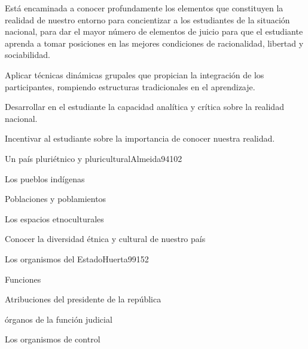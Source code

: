 \begin{syllabus}


\begin{justification}
Está encaminada a conocer profundamente los elementos que constituyen la realidad de 
nuestro entorno para concientizar a los estudiantes de la situación nacional, 
para dar el mayor número de elementos de juicio para que el estudiante aprenda a tomar 
posiciones en las mejores condiciones de racionalidad, libertad y sociabilidad.
\end{justification}

\begin{goals}
\item Aplicar técnicas dinámicas grupales que propician la integración de los participantes, rompiendo estructuras tradicionales en el aprendizaje.
\item Desarrollar en el estudiante la capacidad analítica y crítica sobre la realidad nacional.
\item Incentivar al estudiante sobre la importancia de conocer nuestra realidad.
\end{goals}

\begin{outcomes}
\end{outcomes}

\begin{unit}{Un país pluriétnico y pluricultural}{Almeida94}{10}{2}
   \begin{topics}
	\item Los pueblos indígenas
	\item Poblaciones y poblamientos
	\item Los espacios etnoculturales
   \end{topics}

   \begin{unitgoals}
      \item Conocer la diversidad étnica y cultural de nuestro país
   \end{unitgoals}
\end{unit}

\begin{unit}{Los organismos del Estado}{Huerta99}{15}{2}
   \begin{topics}
      \item Funciones
	\item Atribuciones del presidente de la república
	\item órganos de la función judicial
	\item Los organismos de control
  \end{topics}


\end{unit}
\end{syllabus}
